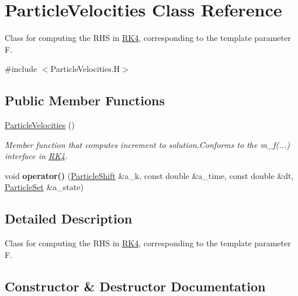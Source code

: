 \hypertarget{class_particle_velocities}{}\section{Particle\+Velocities Class Reference}
\label{class_particle_velocities}


Class for computing the R\+HS in \hyperlink{class_r_k4}{R\+K4}, corresponding to the template parameter F.  




{\ttfamily \#include $<$Particle\+Velocities.\+H$>$}

\subsection*{Public Member Functions}
\begin{DoxyCompactItemize}
\item 
\hyperlink{class_particle_velocities_a10b68a5a7868192c508bc2b4a492aa51}{Particle\+Velocities} ()
\begin{DoxyCompactList}\small\item\em Member function that computes increment to solution.\+Conforms to the m\+\_\+f(...) interface in \hyperlink{class_r_k4}{R\+K4}. \end{DoxyCompactList}\item 
\mbox{\label{class_particle_velocities_a72b8fd71b794e841c5f67dc2b728dec1}} 
void {\bfseries operator()} (\hyperlink{class_particle_shift}{Particle\+Shift} \&a\+\_\+k, const double \&a\+\_\+time, const double \&dt, \hyperlink{class_particle_set}{Particle\+Set} \&a\+\_\+state)
\end{DoxyCompactItemize}


\subsection{Detailed Description}
Class for computing the R\+HS in \hyperlink{class_r_k4}{R\+K4}, corresponding to the template parameter F. 

\subsection{Constructor \& Destructor Documentation}
\mbox{\label{class_particle_velocities_a10b68a5a7868192c508bc2b4a492aa51}} 
